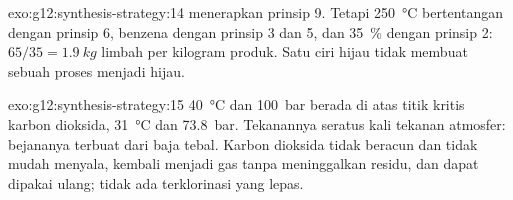 \begin{solution}{exo:g12:synthesis-strategy:14}
 menerapkan prinsip 9. Tetapi \qty{250}{\celsius} bertentangan
dengan prinsip 6, benzena dengan prinsip 3 dan 5, dan 
\qty{35}{\percent} dengan prinsip 2: $65/35 = \qty{1.9}{kg}$ limbah per
kilogram produk. Satu ciri hijau tidak membuat sebuah proses menjadi
hijau.
\end{solution}

\begin{solution}{exo:g12:synthesis-strategy:15}
\qty{40}{\celsius} dan \qty{100}{bar} berada di atas titik kritis
karbon dioksida, \qty{31}{\celsius} dan \qty{73.8}{bar}. Tekanannya
seratus kali tekanan atmosfer: bejananya terbuat dari baja tebal. Karbon
dioksida tidak beracun dan tidak mudah menyala, kembali menjadi gas tanpa
meninggalkan residu, dan dapat dipakai ulang; tidak ada 
terklorinasi yang lepas.
\end{solution}

